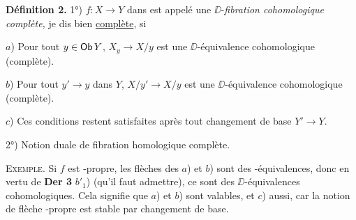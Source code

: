 \textbf{Définition 2.} 1°) $f : X \to Y$ dans \Dia{} est appelé une $\DD$-\textit{fibration cohomologique complète,} je dis bien \underline{complète}, si

$a$) Pour tout $y \in \mathsf{Ob}\, Y$, $X_y \to X/y$ est une $\DD$-équivalence cohomologique (complète).

$b$) Pour tout $y' \to y$ dans $Y$, $X/y' \to X/y$ est une $\DD$-équivalence cohomologique (complète).


$c$) Ces conditions restent satisfaites après tout changement de base $Y' \to Y$.

2°) Notion duale de fibration homologique complète.

\textsc{Exemple.} Si $f$ est \Hot-propre, les flèches des $a$) et $b$) sont des \Hot-équivalences, donc en vertu de \textbf{Der 3} $b'_1$) (qu’il faut admettre), ce sont des $\DD$-équivalences cohomologiques. Cela signifie que $a$) et $b$) sont valables, et $c$) aussi, car la notion de flèche \Hot-propre est stable par changement de base.


